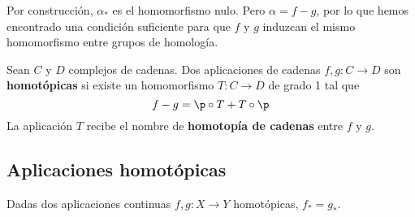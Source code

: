 Por construcción, $\alpha_*$ es el homomorfismo nulo. Pero $\alpha=f-g$, por lo
que hemos encontrado una condición suficiente para que $f$ y $g$ induzcan el
mismo homomorfismo entre grupos de homología.

\begin{defn}
Sean $C$ y $D$ complejos de cadenas. Dos aplicaciones de cadenas
$f,g\colon C \to D$ son \textbf{homotópicas} si existe un homomorfismo $T\colon
C \to D$ de grado 1 tal que
\[f-g=\p \circ T+T\circ \p\]
La aplicación $T$ recibe el nombre de \textbf{homotopía de cadenas} entre $f$ y
$g$.
\end{defn}

\subsection{Aplicaciones homotópicas}
\begin{theorem}
Dadas dos aplicaciones continuas $f,g\colon X \to Y$ homotópicas, $f_*=g_*$.
\end{theorem}

